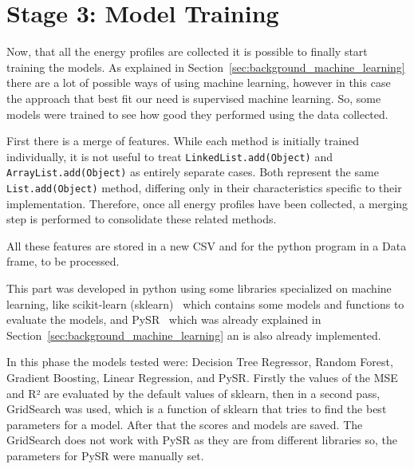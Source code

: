 \section{Stage 3: Model Training} \label{sec:work_stage3_model_training}

Now, that all the energy profiles are collected it is possible to finally start training the models. As explained in Section~\ref{sec:background_machine_learning} there are a lot of possible ways of using machine learning, however in this case the approach that best fit our need is supervised machine learning. So, some models were trained to see how good they performed using the data collected.

First there is a merge of features. While each method is initially trained individually, it is not useful to treat \texttt{LinkedList.add(Object)} and \texttt{ArrayList.add(Object)} as entirely separate cases. Both represent the same \texttt{List.add(Object)} method, differing only in their characteristics specific to their implementation. Therefore, once all energy profiles have been collected, a merging step is performed to consolidate these related methods.

All these features are stored in a new CSV and for the python program in a Data frame, to be processed.

This part was developed in python using some libraries specialized on machine learning, like scikit-learn (sklearn)~\cite{scikit-learn} which contains some models and functions to evaluate the models, and PySR~\cite{cranmer2023interpretablemachinelearningscience} which was already explained in Section~\ref{sec:background_machine_learning} an is also already implemented.

In this phase the models tested were: Decision Tree Regressor, Random Forest, Gradient Boosting, Linear Regression, and PySR. Firstly the values of the MSE and R² are evaluated by the default values of sklearn, then in a second pass, GridSearch was used, which is a function of sklearn that tries to find the best parameters for a model. After that the scores and models are saved. The GridSearch does not work with PySR as they are from different libraries so, the parameters for PySR were manually set.

